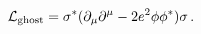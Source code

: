 \begin{equation}
{\cal L}_{\rm ghost}= \sigma^* ( \partial_\mu \partial^\mu 
-2e^2 \phi \phi^* )\sigma \,.\label{ghostac}
\end{equation}

